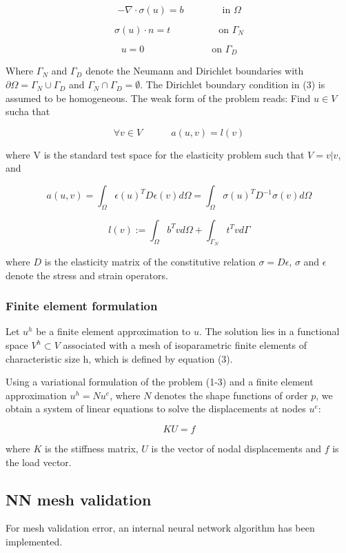 \begin{equation}
- \nabla \cdot \sigma (u) = b \quad \quad \quad \quad  \text{in } \Omega
\end{equation}

\begin{equation}
\sigma (u) \cdot n = t \quad \quad \quad \quad \quad  \text{on } \Gamma _N
\end{equation}

\begin{equation}
u = 0 \quad \quad \quad \quad \quad \quad \quad \text{on } \Gamma _D
\end{equation}

Where $\Gamma _N$ and $\Gamma _D$ denote the Neumann and Dirichlet boundaries with $\partial \Omega = \Gamma _N \cup \Gamma _D$  and $\Gamma _N \cap \Gamma _D = \emptyset$. The Dirichlet boundary condition in (3) is assumed to be homogeneous. The weak form of the problem reads: Find $u \in V$ sucha that

\begin{equation}
\forall v \in V \quad \quad \quad a (u,v) = l(v)
\end{equation}

where V is the standard test space for the elasticity problem such that $V = {v | v }$, and 

\begin{equation}
	a (u,v) = \int _\Omega \epsilon (u ) ^T D \epsilon (v) d \Omega = \int _\Omega \sigma (u)^T D ^{-1} \sigma (v) d\Omega
\end{equation}

\begin{equation}
l (v) := \int _\Omega b^T v d\Omega + \int _{\Gamma _N} t^T v d \Gamma
\end{equation}

where $D$ is the elasticity matrix of the constitutive relation $\sigma = D \epsilon$, $\sigma$ and $\epsilon$ denote the stress and strain operators.

\subsubsection{Finite element formulation}

Let $u ^h$ be a finite element approximation to $u$. The solution lies in a functional space $V ^h \subset V$ associated with a mesh of isoparametric finite elements of characteristic size h, which is defined by equation (3). 

Using a variational formulation of the problem (1-3) and a finite element approximation $u^h = N u^{e}$, where $N$ denotes the shape functions of order $p$, we obtain a system of linear equations to solve the displacements at nodes $u^e$:

\begin{equation}
K U = f
\end{equation}

where $K$ is the stiffness matrix, $U$ is the vector of nodal displacements and $f$ is the load vector.


\subsection{NN mesh validation}

For mesh validation error, an internal neural network algorithm has been implemented.